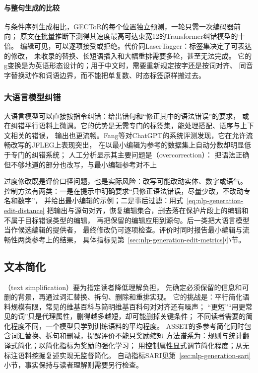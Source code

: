 \paragraph{与整句生成的比较}
与条件序列生成相比，GECToR的每个位置独立预测，一轮只需一次编码器前向；
原文在批量推断下测得其速度最高可达束宽12的Transformer纠错模型\cite{zhao2019improving}的十倍。
编辑可见，可以逐项接受或拒绝。代价同LaserTagger：标签集决定了可表达的修改，
未收录的替换、长短语插入和大幅重排需要多轮，甚至无法完成。
它的g变换是为英语形态设计的；用于中文时，需要重新规定按字还是按词对齐、
同音字替换动作和词语边界，而不能把单复数、时态标签原样搬过去。

\subsubsection{大语言模型纠错}
\label{sec:nlp-generation-llm-gec}

大语言模型可以直接按指令纠错：给出错句和“修正其中的语法错误”的要求，
或在纠错平行语料上微调。它的优势是无需专门的标签集，能处理搭配、语序与上下文相关的错误，
输出也更流畅。Fang等对ChatGPT的系统评测发现，它在允许流畅改写的JFLEG上表现突出，
在以最小编辑为参考的数据集上自动分数却明显低于专门的纠错系统；
人工分析显示其主要问题是（overcorrection）：
把语法正确但不够地道的部分也改写，与最小编辑参考对不上

过度修改既是评价口径问题，也是实际风险：改写可能改动实体、数字或语气。
控制方法有两类：一是在提示中明确要求“只修正语法错误，尽量少改，不改动专名和数字”，
并给出最小编辑的示例；二是事后过滤：用式~\eqref{eq:nlp-generation-edit-distance}
把输出与源句对齐，恢复编辑集合，删去落在保护片段上的编辑和不属于目标错误类型的编辑，
再把保留的编辑应用到源句。后一类把大语言模型当作候选编辑的提供者，
最终修改仍可逐项检查。评价时同时报告最小编辑与流畅性两类参考上的结果，
具体指标见第~\ref{sec:nlp-generation-edit-metrics}小节。

\subsection{文本简化}
\label{sec:nlp-generation-simplification}

（text simplification）要为指定读者降低理解负担，
先确定必须保留的信息和可删的背景，再通过词汇替换、拆句、删除和重排实现。
它的挑战是：平行简化语料规模有限，常见的维基百科与简明维基百科句对对齐还有噪声；
“更短”“用更常见的词”只是代理属性，删得越多越短，却可能删掉关键条件；
不同读者需要的简化程度不同，一个模型只学到训练语料的平均程度。
ASSET的多参考简化同时包含词汇替换、拆句和删减，提醒评价不能只奖励缩短
方法谱系为：规则与统计翻译式简化；以简化指标为奖励的强化学习；
用控制属性显式调节简化程度；从无标注语料挖掘复述实现无监督简化。
自动指标SARI见第~\ref{sec:nlp-generation-sari}小节，事实保持与读者理解则需要另行检查。

